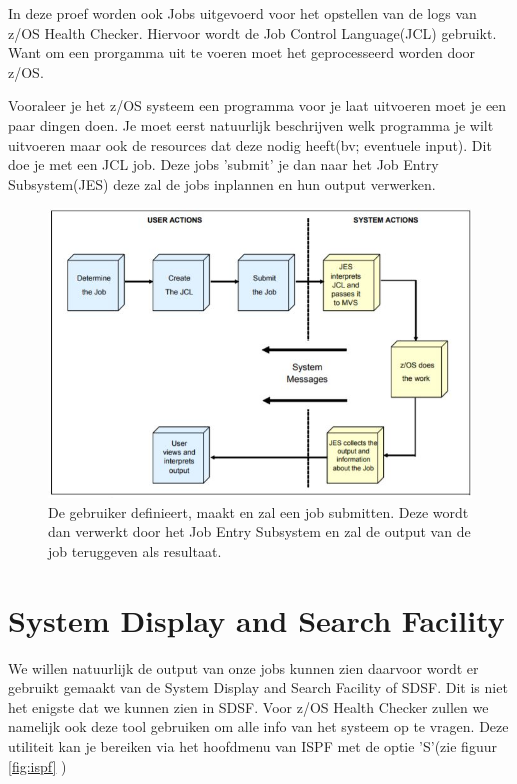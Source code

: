 In deze proef worden ook Jobs uitgevoerd voor het opstellen van de logs van z/OS Health Checker. Hiervoor wordt de Job Control Language(JCL) gebruikt. Want om een prorgamma uit te voeren moet het geprocesseerd worden door z/OS.

Vooraleer je het z/OS systeem een programma voor je laat uitvoeren moet je een paar dingen doen. Je moet eerst natuurlijk beschrijven welk programma je wilt uitvoeren maar ook de resources dat deze nodig heeft(bv; eventuele input). Dit doe je met een JCL job. Deze jobs 'submit' je dan naar het Job Entry Subsystem(JES) deze zal de jobs inplannen en hun output verwerken. \cite{Cosimo2018}

\begin{figure}[h]
	\centering
	\includegraphics{img/JES}
	\caption[Visualisatie van JCL en JES]{De gebruiker definieert, maakt en zal een job submitten. Deze wordt dan verwerkt door het Job Entry Subsystem en zal de output van de job teruggeven als resultaat.}
	\label{fig:jes}
\end{figure}

\section{System Display and Search Facility}
\label{sec:System Display and Search Facility}

We willen natuurlijk de output van onze jobs kunnen zien daarvoor wordt er gebruikt gemaakt van de System Display and Search Facility of SDSF. Dit is niet het enigste dat we kunnen zien in SDSF. Voor z/OS Health Checker zullen we namelijk ook deze tool gebruiken om alle info van het systeem op te vragen. Deze utiliteit kan je bereiken via het hoofdmenu van ISPF met de optie 'S'(zie figuur \ref{fig:ispf} )

